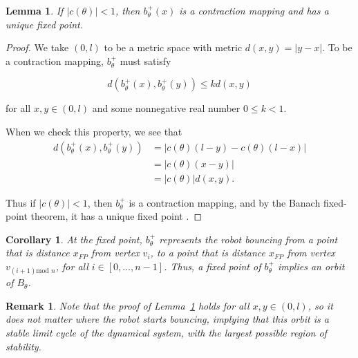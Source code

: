 \documentclass[letterpaper, 10 pt, conference]{ieeeconf}  %
\newtheorem{remark}{\bf Remark}
\newtheorem{corollary}{\bf Corollary}
\newtheorem{lemma}{\bf Lemma}
\begin{document}
\begin{lemma} \label{Lemma:2}
If $|c(\theta)| < 1$, then $b^+_{\theta}(x)$ is a contraction
mapping and has a unique fixed point.
\end{lemma}
\begin{proof}
We take $(0,l)$ to be a metric space with metric $d(x,y) =
|y-x|$. To be a contraction mapping, $b^+_{\theta}$ must satisfy

$$ d(b^+_{\theta}(x), b^+_{\theta}(y)) \leq k d(x,y) $$

for all $x, y \in (0,l)$ and some nonnegative real number $0 \leq k < 1$.

When we check this property, we see that
\begin{align*}
d(b^+_{\theta}(x), b^+_{\theta}(y)) & = | c(\theta)(l-y) - c(\theta)(l-x)| \\
                               & = | c(\theta) (x-y) | \\
                               & = | c(\theta) | d(x,y).
\end{align*}

Thus if $|c(\theta)| < 1$, then $b^+_{\theta}$ is a contraction mapping, and by the Banach fixed-point
theorem, it has a unique fixed point \cite{Granas2003}.
\end{proof}
\begin{corollary} \label{corollary:sp}
At the fixed point, $b^+_{\theta}$ represents the 
robot bouncing from a point that is distance $x_{FP}$ from vertex $v_i$, to a
point that is distance $x_{FP}$ from vertex $v_{(i+1) \text{mod }n}$, for all $i \in
[0,\ldots, n-1]$.
Thus, a fixed point of $b^+_{\theta}$ implies an orbit of $B_\theta$.


\end{corollary}
\begin{remark} \label{rm1}
Note that the proof of Lemma~\ref{Lemma:2} holds for all $x,y \in
(0, l)$, so it does not matter where the robot starts bouncing,
implying that this orbit is a stable limit cycle of the dynamical system, 
with the largest possible region of stability.
\end{remark}
\end{document}

